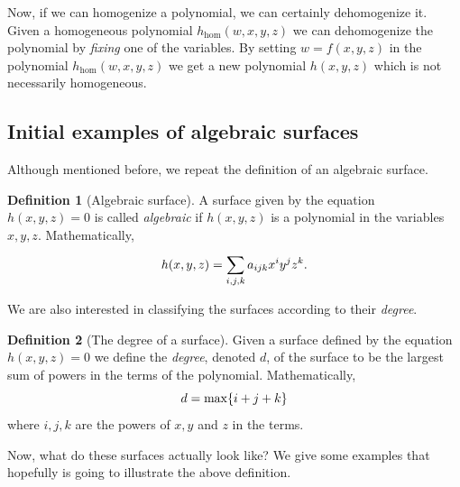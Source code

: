 \documentclass[a4paper]{article}
\theoremstyle{definition}
\newtheorem{defn}{Definition}
\theoremstyle{plain}
\renewcommand{\hom}{\ensuremath{h_{\mathrm{hom}}}}
\begin{document}
    Now, if we can homogenize a polynomial, we can certainly dehomogenize it.
    Given a homogeneous polynomial $\hom(w, x, y, z)$ we can dehomogenize the
    polynomial by \emph{fixing} one of the variables. By setting $w = f(x, y,
    z)$ in the polynomial $\hom(w, x, y, z)$ we get a new polynomial $h(x,
    y, z)$ which is not necessarily homogeneous. 

    \subsection{Initial examples of algebraic surfaces}
    \label{sub:initial_examples_of_algebraic_surfaces}
    
    Although mentioned before, we repeat the definition of an algebraic surface.
    \begin{defn}[Algebraic surface]
        A surface given by the equation $h(x, y, z) = 0$ is called \emph{algebraic}
        if $h(x, y, z)$ is a polynomial in the variables $x, y, z$.
        Mathematically,
        \begin{equation}
            \notag
            h(x, y, z) = \sum^{}_{i, j, k} a_{ijk}x^iy^jz^k.
        \end{equation}
    \end{defn}     

    We are also interested in classifying the surfaces according to their
    \emph{degree}. 
    \begin{defn}[The degree of a surface]
        Given a surface defined by the equation $h(x, y, z) = 0$ we define the
        \emph{degree}, denoted $d$, of the surface to be the largest sum of
        powers in the terms of the polynomial. Mathematically,
        \begin{equation}
            \notag
            d = \max\{i + j + k\}
        \end{equation}
        where $i, j, k$ are the powers of $x, y$ and $z$ in the terms.
    \end{defn}
    Now, what do these surfaces actually look like? We give some examples that
    hopefully is going to illustrate the above definition.
    
\end{document}
